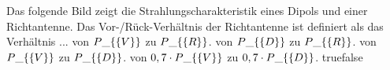     {Das folgende Bild zeigt die Strahlungscharakteristik eines Dipols und einer Richtantenne. Das Vor-/Rück-Verhältnis der Richtantenne ist definiert als das Verhältnis ...}
    {von $P\_\{\textrm\{V\}\}$ zu $P\_\{\textrm\{R\}\}$.}
    {von $P\_\{\textrm\{D\}\}$ zu $P\_\{\textrm\{R\}\}$.}
    {von $P\_\{\textrm\{V\}\}$ zu $P\_\{\textrm\{D\}\}$.}
    {von $0,7 \cdot P\_\{\textrm\{V\}\}$ zu $0,7 \cdot P\_\{\textrm\{D\}\}$.}
    {true}{false}